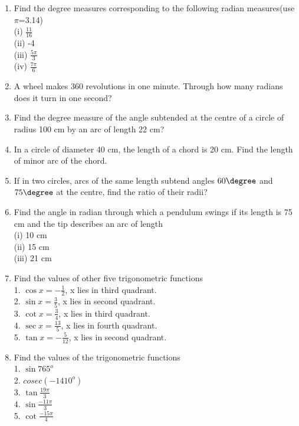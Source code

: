 \begin{enumerate}[label=\arabic*.,ref=\thesubsection.\theenumi]
\item Find the degree measures corresponding to the following radian measures(use $\pi$=3.14)\\
(i) $\frac{11}{16}$\\
(ii) -4\\
(iii) $\frac{5\pi}{3}$\\
(iv) $\frac{7\pi}{6}$\\

\item A wheel makes 360 revolutions in one minute. Through how many radians does it turn in one second?

\item Find the degree measure of the angle subtended at the centre of a circle of radius 100 cm by an arc of length 22 cm?

\item In a circle of diameter 40 cm, the length of a chord is 20 cm. Find the length of minor arc of the chord.

\item If in two circles, arcs of the same length subtend angles $60\degree$ and $75\degree$ at the centre, find the ratio of their radii?

\item Find the angle in radian through which a pendulum swings if its length is 75 cm and the tip describes an arc of length\\
(i) 10 cm\\
(ii) 15 cm\\
(iii) 21 cm

\item Find the values of other five trigonometric functions\\ 
1. $\cos x=-\frac{1}{2}$, x lies in third quadrant.\\
2. $\sin x= \frac{3}{5}$, x lies in second quadrant.\\
3. $\cot x= \frac{3}{4}$, x lies in third quadrant.\\
4. $\sec x= \frac{13}{5}$, x lies in fourth quadrant.\\
5. $\tan x=-\frac{5}{12}$, x lies in second quadrant.

\item Find the values of the trigonometric functions\\
1. $\sin765^{o}$\\
2. $cosec(-1410^{o})$\\
3. $\tan\frac{19\pi}{3}$\\
4. $\sin\frac{-11\pi}{3}$\\
5. $\cot\frac{-15\pi}{4}$


\end{enumerate}
